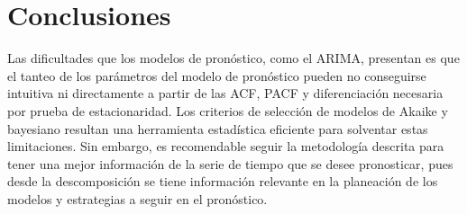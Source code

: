 \documentclass{elsarticle}
\begin{document}
\section{Conclusiones}
\label{conclusiones}

Las dificultades que los modelos de pronóstico, como el ARIMA, presentan es que el tanteo de los parámetros del modelo de pronóstico pueden no conseguirse intuitiva ni directamente a partir de las ACF, PACF y diferenciación necesaria por prueba de estacionaridad. Los criterios de selección de modelos de Akaike y bayesiano resultan una herramienta estadística eficiente para solventar estas limitaciones. Sin embargo, es recomendable seguir la metodología descrita para tener una mejor información de la serie de tiempo que se desee pronosticar, pues desde la descomposición se tiene información relevante en la planeación de los modelos y estrategias a seguir en el pronóstico.


\end{document}
